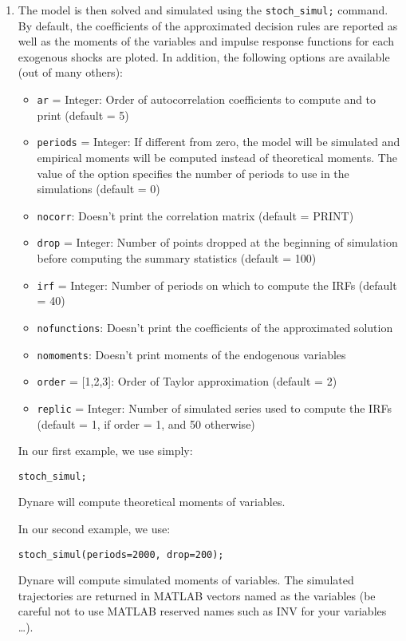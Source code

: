 \documentclass[11pt,a4paper]{article}
\begin{document}
\begin{enumerate}
\item The model is then solved and simulated using the {\tt stoch\_simul;} command. By default, the coefficients of the approximated decision rules are reported as well as the moments of the variables and impulse response functions for each exogenous shocks are ploted. In addition, the following options are available (out of many others):
\begin{itemize}
\item {\tt ar} = Integer:
Order of autocorrelation coefficients to compute and to print (default = 5)
\item {\tt periods} = Integer:
If different from zero, the model will be simulated and empirical moments will be computed instead of theoretical moments. The value of the option specifies the number of periods to use in the simulations (default = 0)
\item {\tt nocorr}:
Doesn't print the correlation matrix (default = PRINT)
\item {\tt drop} = Integer:
Number of points dropped at the beginning of simulation before computing the summary statistics (default = 100)
\item {\tt irf} = Integer:
Number of periods on which to compute the IRFs (default = 40)
\item {\tt nofunctions}:
Doesn't print the coefficients of the approximated solution
\item {\tt nomoments}:
Doesn't print moments of the endogenous variables 
\item {\tt order} = [1,2,3]:
Order of Taylor approximation (default = 2)
\item {\tt replic} = Integer:
Number of simulated series used to compute the IRFs (default = 1, if order = 1, and 50 otherwise)
\end{itemize} 

In our first example, we use simply:
\begin{verbatim}
stoch_simul;
\end{verbatim}
{\sc Dynare} will compute theoretical moments of variables.

In our second example, we use:
\begin{verbatim}
stoch_simul(periods=2000, drop=200);
\end{verbatim}
{\sc Dynare} will compute simulated moments of variables. The simulated trajectories are returned in MATLAB vectors named as the variables (be careful not to use MATLAB reserved names such as INV for your variables \ldots).
\end{enumerate}
\end{document}
